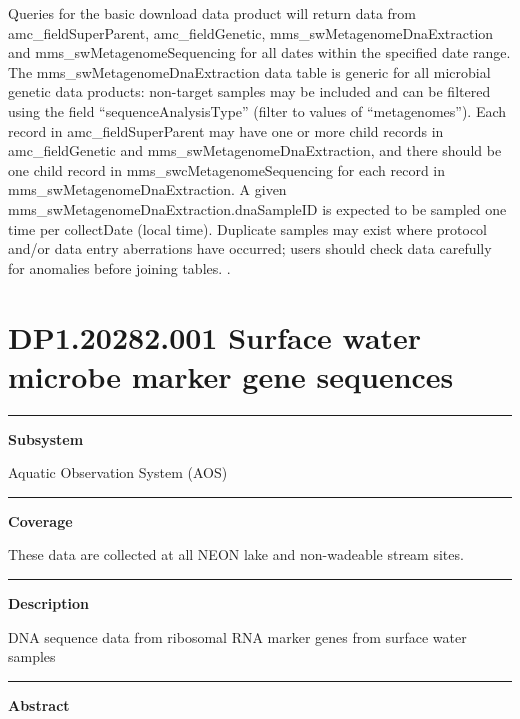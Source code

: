 \documentclass[]{article}
\begin{document}
Queries for the basic download data product will return data from
amc\_fieldSuperParent, amc\_fieldGenetic, mms\_swMetagenomeDnaExtraction
and mms\_swMetagenomeSequencing for all dates within the specified date
range. The mms\_swMetagenomeDnaExtraction data table is generic for all
microbial genetic data products: non-target samples may be included and
can be filtered using the field ``sequenceAnalysisType'' (filter to
values of ``metagenomes''). Each record in amc\_fieldSuperParent may
have one or more child records in amc\_fieldGenetic and
mms\_swMetagenomeDnaExtraction, and there should be one child record in
mms\_swcMetagenomeSequencing for each record in
mms\_swMetagenomeDnaExtraction. A given
mms\_swMetagenomeDnaExtraction.dnaSampleID is expected to be sampled one
time per collectDate (local time). Duplicate samples may exist where
protocol and/or data entry aberrations have occurred; users should check
data carefully for anomalies before joining tables. \newpage
.

\section{DP1.20282.001 Surface water microbe marker gene
sequences}\label{dp1.20282.001-surface-water-microbe-marker-gene-sequences}

\begin{center}\rule{0.5\linewidth}{\linethickness}\end{center}

\textbf{Subsystem}

Aquatic Observation System (AOS)

\begin{center}\rule{0.5\linewidth}{\linethickness}\end{center}

\textbf{Coverage}

These data are collected at all NEON lake and non-wadeable stream sites.

\begin{center}\rule{0.5\linewidth}{\linethickness}\end{center}

\textbf{Description}

DNA sequence data from ribosomal RNA marker genes from surface water
samples

\begin{center}\rule{0.5\linewidth}{\linethickness}\end{center}

\textbf{Abstract}
\end{document}
